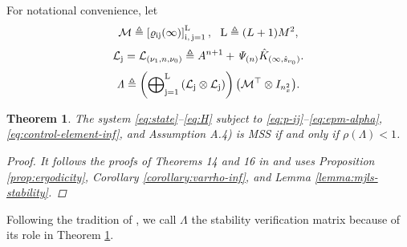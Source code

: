 \documentclass[letterpaper, 10 pt, conference]{ieeeconf}  %
\newtheorem{theorem}{Theorem}
\begin{document}
For notational convenience, let 
\begin{equation}\label{eq:mathcalM}
    \text{\small $\mathcal{M} \triangleq \left[ \varrho_{{\mathrm{i}\mathrm{j}}}(\infty)\right]_{\mathrm{i},\,\mathrm{j}=1}^{\mathrm{L}},~~
    \mathrm{L}\triangleq (L+1)M^2$},
\end{equation}
\begin{equation}\label{eq:mathcalL}
    \text{\small $\mathcal{L}_{\mathrm{j}} = \mathcal{L}_{({\nu_1},n,{\nu_0})} \triangleq A^{n+1} + \mathit{\Psi}_{(n)} \hat{K}_{(\infty,\hat{s}_{\nu_0})}$}.
\end{equation}
\begin{equation}\label{eq:Lambda}
\text{\small $\mathit{\Lambda} \triangleq \left( \bigoplus\nolimits_{\mathrm{j}=1}^{\mathrm{L}} 
    \left( \mathcal{L}_{\mathrm{j}} \otimes \mathcal{L}_{\mathrm{j}} \right)\right)
    \left( \mathcal{M}^{\top} \otimes I_{n_x^2} \right)$}. %
\end{equation}
\begin{theorem}\label{theorem:stability}
    The system \eqref{eq:state}--\eqref{eq:H} subject to \eqref{eq:p-ij}--\eqref{eq:epm-alpha}, \eqref{eq:control-element-inf}, and Assumption A.4) is MSS if and only if $\rho\left(\mathit{\Lambda}\right)<1$.

    \begin{proof}
        It follows the proofs of Theorems 14 and 16 in \cite{yZL-2025-automatica} and uses Proposition \ref{prop:ergodicity}, Corollary \ref{corollary:varrho-inf}, and Lemma \ref{lemma:mjls-stability}.
    \end{proof}
\end{theorem}
Following the tradition of \cite{yZL-2025-automatica}, we call $\mathit{\Lambda}$ the stability verification matrix because of its role in Theorem \ref{theorem:stability}.
\end{document}
